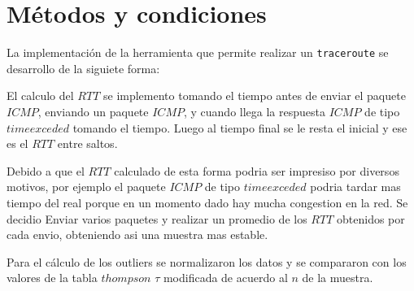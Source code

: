 \section{Métodos y condiciones}
\PARstart La implementaci\'on de la herramienta que permite realizar un \verb+traceroute+ se desarrollo de la siguiete forma:

El calculo del $RTT$ se implemento tomando el tiempo antes de enviar el paquete $ICMP$, enviando un paquete $ICMP$, y cuando llega la respuesta $ICMP$ de tipo $time exceded$ tomando el tiempo. Luego al tiempo final se le resta el inicial y ese es el $RTT$ entre saltos. 

Debido a que el $RTT$ calculado de esta forma podria ser impresiso por diversos motivos, por ejemplo el paquete $ICMP$ de tipo $time exceded$ podria tardar mas tiempo del real porque en un momento dado hay mucha congestion en la red. Se decidio Enviar varios paquetes y realizar un promedio de los $RTT$ obtenidos por cada envio, obteniendo asi una muestra mas estable.

Para el c\'alculo de los outliers se normalizaron los datos y se compararon con los valores de la tabla $thompson$ $\tau$ modificada de acuerdo al $n$ de la muestra. 